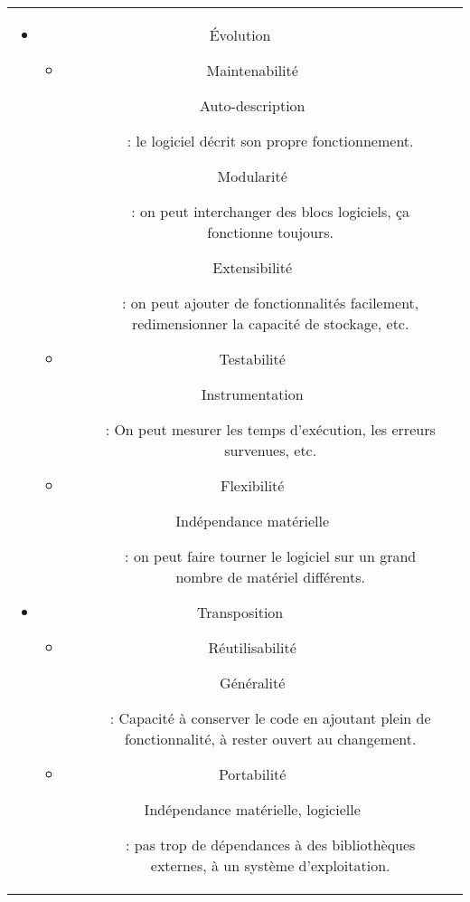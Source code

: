 \begin{tabular}{|c|c|}
\begin{itemize}
\begin{itemize}
	\end{itemize}

\item Évolution
	\begin{itemize}

	\item Maintenabilité
		\begin{description}			
		\item[Auto-description] : le logiciel décrit son propre fonctionnement.		
		\item[Modularité] : on peut interchanger des blocs logiciels, ça fonctionne toujours.
		\item[Extensibilité] : on peut ajouter de fonctionnalités facilement, redimensionner la capacité de stockage, etc.
		\end{description}

	\item Testabilité
		\begin{description}	
		\item[Instrumentation] : On peut mesurer les temps d'exécution, les erreurs survenues, etc.
		\end{description}

	\item Flexibilité
		\begin{description}	
		\item[Indépendance matérielle] : on peut faire tourner le logiciel sur un grand nombre de matériel différents.
		\end{description}

	\end{itemize}	

\item Transposition
	\begin{itemize}

	\item Réutilisabilité
		\begin{description}	
		\item[Généralité] : Capacité à conserver le code en ajoutant plein de fonctionnalité, à rester ouvert au changement.
		\end{description}

	\item Portabilité	
		\begin{description}	
		\item[Indépendance matérielle, logicielle] : pas trop de dépendances à des bibliothèques externes, à un système d'exploitation.
		\end{description}


\end{itemize}
\end{itemize}
\end{tabular}
